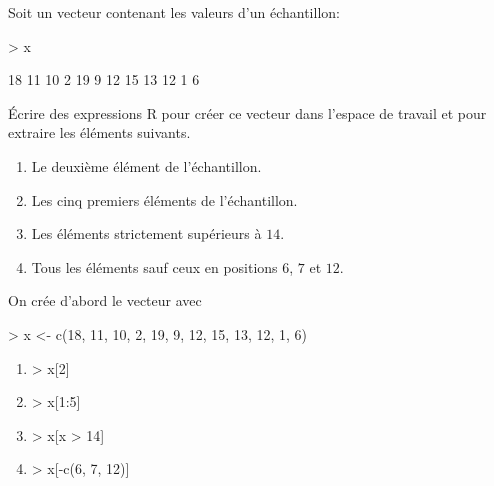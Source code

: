 \begin{exercice}
  Soit  un vecteur contenant les valeurs d'un échantillon:
  \begin{center}
\begin{Schunk}
\begin{Sinput}
> x
\end{Sinput}
\begin{Soutput}
 [1] 18 11 10  2 19  9 12 15 13 12  1  6
\end{Soutput}
\end{Schunk}
  \end{center}
  Écrire des expressions R pour créer ce vecteur dans l'espace de
  travail et pour extraire les éléments suivants.
  \begin{enumerate}
  \item Le deuxième élément de l'échantillon.
  \item Les cinq premiers éléments de l'échantillon.
  \item Les éléments strictement supérieurs à $14$.
  \item Tous les éléments sauf ceux en positions $6$, $7$ et $12$.
  \end{enumerate}
  \begin{sol}
    On crée d'abord le vecteur avec
\begin{Schunk}
\begin{Sinput}
> x <- c(18, 11, 10, 2, 19, 9, 12, 15, 13, 12, 1, 6)
\end{Sinput}
\end{Schunk}
    \begin{enumerate}
\item
\begin{Schunk}
\begin{Sinput}
> x[2]
\end{Sinput}
\end{Schunk}
\item
\begin{Schunk}
\begin{Sinput}
> x[1:5]
\end{Sinput}
\end{Schunk}
\item
\begin{Schunk}
\begin{Sinput}
> x[x > 14]
\end{Sinput}
\end{Schunk}
\item
\begin{Schunk}
\begin{Sinput}
> x[-c(6, 7, 12)]
\end{Sinput}
\end{Schunk}
    \end{enumerate}
  \end{sol}
\end{exercice}

